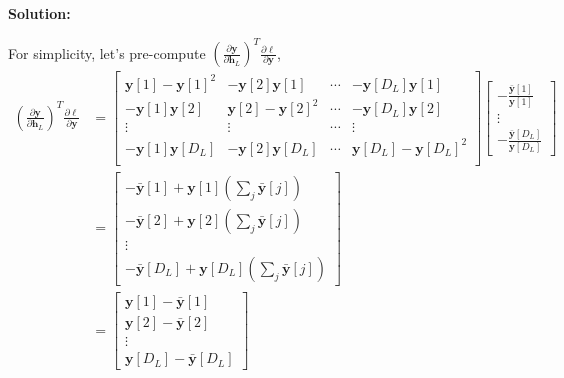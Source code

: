 \documentclass{article}
\newenvironment{solution}
  {\par\noindent\textbf{Solution:}\par}
  {\par}
\begin{document}
\begin{solution}
For simplicity, let's pre-compute $\left( \frac{\partial \textbf{y}}{\partial \textbf{h}_L} \right)^T \frac{\partial \ell}{\partial \textbf{y}}$,
\[
  \begin{aligned}
    \left( \frac{\partial \textbf{y}}{\partial \textbf{h}_L} \right)^T \frac{\partial \ell}{\partial \textbf{y}} &= \begin{bmatrix} \textbf{y}[1] - \textbf{y}[1]^2 & -\textbf{y}[2]\textbf{y}[1] & \cdots & -\textbf{y}[D_L]\textbf{y}[1] \\ 
      -\textbf{y}[1]\textbf{y}[2] & \textbf{y}[2]-\textbf{y}[2]^2 & \cdots & -\textbf{y}[D_L]\textbf{y}[2] \\
      \vdots & \vdots & \cdots & \vdots \\ 
       -\textbf{y}[1]\textbf{y}[D_L] & -\textbf{y}[2]\textbf{y}[D_L] & \cdots &  \textbf{y}[D_L] - \textbf{y}[D_L]^2 \\
       \end{bmatrix} \begin{bmatrix} -\frac{\bar{\textbf{y}}[1]}{\textbf{y}[1]} \\ \vdots  \\ -\frac{\bar{\textbf{y}}[D_L]}{\textbf{y}[D_L]}  \end{bmatrix}
  \\
                                     &= \begin{bmatrix} -\bar{\textbf{y}}[1] + \textbf{y}[1]\left( \sum_j \bar{\textbf{y}}[j] \right) \\ 
                                     -\bar{\textbf{y}}[2] + \textbf{y}[2]\left( \sum_j \bar{\textbf{y}}[j] \right) \\ 
                                        \vdots \\ 
                                    -\bar{\textbf{y}}[D_L] + \textbf{y}[D_L]\left( \sum_j \bar{\textbf{y}}[j] \right) 
                                   \end{bmatrix}
                                  \\
                                     &= \begin{bmatrix} \textbf{y}[1] - \bar{\textbf{y}}[1] \\ 
                                      \textbf{y}[2] - \bar{\textbf{y}}[2] \\ 
                                    \vdots \\ 
                                \textbf{y}[D_L] - \bar{\textbf{y}}[D_L] 
                                  \end{bmatrix}
     \end{aligned}
\]


\end{solution}
\end{document}
